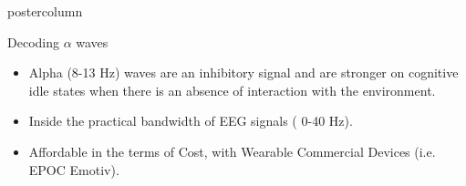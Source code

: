 \documentclass[final]{beamer}
\begin{document}
\begin{frame}
\begin{columns}
\begin{column}{.49\textwidth}
\begin{beamercolorbox}[center,wd=\textwidth]{postercolumn}
\begin{minipage}[T]{.95\textwidth}
{            
            \vfill
            \begin{block}{Decoding $ \alpha$  waves}
              \begin{itemize}
              \item Alpha (8-13 Hz) waves are an inhibitory signal and are stronger on cognitive idle states when there is an absence of interaction with the environment.
              \item Inside the practical bandwidth of EEG signals ( 0-40 Hz).
              \item Affordable in the terms of Cost, with Wearable Commercial Devices (i.e. EPOC Emotiv).
              \end{itemize}
              

\end{block}}
\end{minipage}
\end{beamercolorbox}
\end{column}
\end{columns}
\end{frame}
\end{document}
